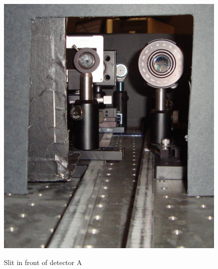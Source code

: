 \documentclass{../lab}
\begin{document}
\begin{figure}[H]
\captionsetup{justification=centering}
  \href{http://experimentationlab.berkeley.edu/sites/default/files/images/Qe_beamview.jpeg}{\includegraphics[width=\linewidth,keepaspectratio]{images/Qe_beamview.jpeg}}
  \caption{Slit in front of detector A}
  \label{fig:Qe_beamview.jpeg}
\endminipage\hfill
{}

\end{figure}
\end{document}
